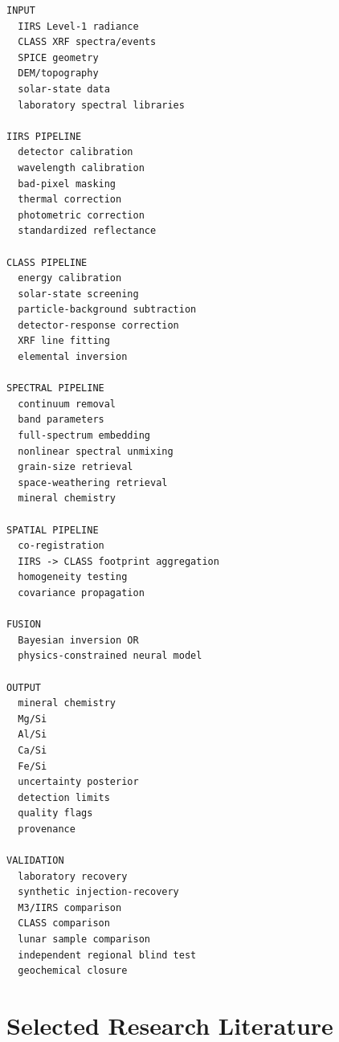 \documentclass[11pt,a4paper]{article}
\begin{document}
\begin{lstlisting}
INPUT
  IIRS Level-1 radiance
  CLASS XRF spectra/events
  SPICE geometry
  DEM/topography
  solar-state data
  laboratory spectral libraries

IIRS PIPELINE
  detector calibration
  wavelength calibration
  bad-pixel masking
  thermal correction
  photometric correction
  standardized reflectance

CLASS PIPELINE
  energy calibration
  solar-state screening
  particle-background subtraction
  detector-response correction
  XRF line fitting
  elemental inversion

SPECTRAL PIPELINE
  continuum removal
  band parameters
  full-spectrum embedding
  nonlinear spectral unmixing
  grain-size retrieval
  space-weathering retrieval
  mineral chemistry

SPATIAL PIPELINE
  co-registration
  IIRS -> CLASS footprint aggregation
  homogeneity testing
  covariance propagation

FUSION
  Bayesian inversion OR
  physics-constrained neural model

OUTPUT
  mineral chemistry
  Mg/Si
  Al/Si
  Ca/Si
  Fe/Si
  uncertainty posterior
  detection limits
  quality flags
  provenance

VALIDATION
  laboratory recovery
  synthetic injection-recovery
  M3/IIRS comparison
  CLASS comparison
  lunar sample comparison
  independent regional blind test
  geochemical closure
\end{lstlisting}

\section{Selected Research Literature}
\end{document}
